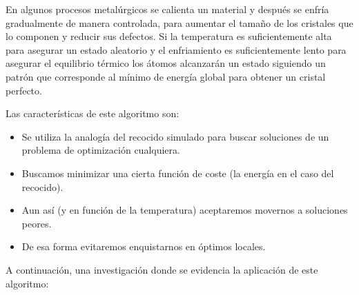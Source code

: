 \documentclass[10pt,conference]{IEEEtran}
\begin{document}
En algunos procesos metalúrgicos se calienta un material y después se enfría gradualmente de manera controlada, para aumentar el tamaño de los cristales que lo componen y reducir sus defectos.
Si la temperatura es suficientemente alta para asegurar un estado aleatorio y el enfriamiento es suficientemente lento para asegurar el equilibrio térmico los átomos alcanzarán un estado siguiendo un patrón que corresponde al mínimo de energía global para obtener un cristal perfecto\citep{simmu}.

Las características de este algoritmo son:
\begin{itemize}
    \item Se utiliza la analogía del recocido simulado para buscar soluciones de un problema de optimización cualquiera.
    \item Buscamos minimizar una cierta función de coste (la energía en el caso del recocido).
    \item Aun así (y en función de la temperatura) aceptaremos movernos a soluciones peores.
   \item De esa forma evitaremos enquistarnos en óptimos locales.
\end{itemize}
A continuación, una investigación donde se evidencia la aplicación de este algoritmo:
\end{document}
